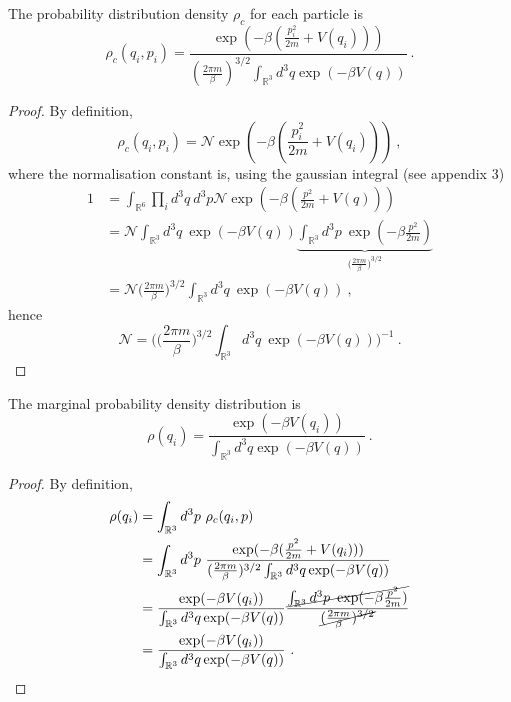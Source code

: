     The probability distribution density $\rho_c$ for each particle is 
    \begin{equation*}
        \rho_c (q_i, p_i) = \frac{\exp (- \beta ( \frac{p^2_i}{2m} + V(q_i) ))}{(\frac{2\pi m}{\beta})^{3/2} \int_{\mathbb R^3} d^3 q \exp(- \beta V(q))} ~.
    \end{equation*}
    \begin{proof}
        By definition, 
        \begin{equation*}
            \rho_c (q_i, p_i) = \mathcal N \exp (- \beta ( \frac{p^2_i}{2m} + V(q_i) )) ~,
        \end{equation*}
        where the normalisation constant is, using the gaussian integral (see appendix 3) 
        \begin{equation*}
        \begin{aligned}
            1 & = \int_{\mathbb R^6} \prod_i d^3 q ~ d^3 p \mathcal N \exp(- \beta ( \frac{p^2}{2m} + V(q))) \\ & = \mathcal N \int_{\mathbb R^3} d^3 q ~ \exp(- \beta V(q))  \underbrace{\int_{\mathbb R^3} d^3 p ~ \exp(- \beta \frac{p^2}{2m})}_{\Big ( \frac{2\pi m}{\beta}\Big)^{3/2}} \\ & = \mathcal N  \Big ( \frac{2\pi m}{\beta}\Big)^{3/2} \int_{\mathbb R^3} d^3 q ~ \exp(- \beta V(q)) ~,
        \end{aligned}
        \end{equation*}
        hence 
        \begin{equation*}
            \mathcal N = \Big ( \Big ( \frac{2\pi m}{\beta}\Big)^{3/2} \int_{\mathbb R^3} d^3 q ~ \exp(- \beta V(q))  \Big )^{-1} ~.
        \end{equation*}
    \end{proof}

    The marginal probability density distribution is 
    \begin{equation*}
        \rho(q_i) = \frac{\exp (- \beta V(q_i) )}{\int_{\mathbb R^3} d^3 q \exp(- \beta V(q))} ~.
    \end{equation*}
    \begin{proof}
        By definition, 
        \begin{equation*}
        \begin{aligned}
            \rho(q_i) & = \int_{\mathbb R^3} d^3 p ~ \rho_c (q_i, p) \\ & = \int_{\mathbb R^3} d^3 p ~ \frac{\exp (- \beta ( \frac{p^2}{2m} + V(q_i) ))}{(\frac{2\pi m}{\beta})^{3/2} \int_{\mathbb R^3} d^3 q \exp(- \beta V(q))} \\ & = \frac{\exp (- \beta V(q_i) )}{\int_{\mathbb R^3} d^3 q \exp(- \beta V(q))} \frac{\cancel{\int_{\mathbb R^3} d^3 p ~ \exp(- \beta \frac{p^2}{2m})}}{\cancel{(\frac{2\pi m}{\beta})^{3/2}}} \\ & = \frac{\exp (- \beta V(q_i) )}{\int_{\mathbb R^3} d^3 q \exp(- \beta V(q))} ~.
        \end{aligned}
        \end{equation*}
    \end{proof}

